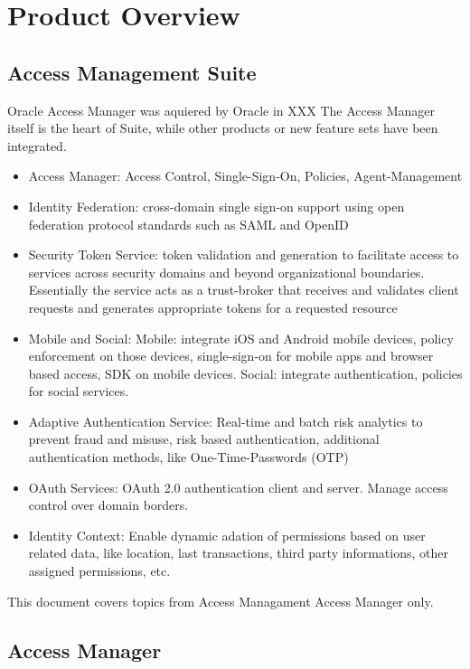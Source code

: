 
\chapter[Product Overview]{Product Overview}

\section{Access Management Suite}

Oracle Access Manager was aquiered by Oracle in
XXX
The Access Manager itself is the heart of Suite, while other products or new feature sets have been integrated. 


\begin{itemize}
    \item Access Manager: Access Control, Single-Sign-On, Policies, Agent-Management
    \item Identity Federation: cross-domain single sign-on support using open federation protocol standards such as SAML and OpenID
    \item Security Token Service: token validation and generation to facilitate access to services across security domains and beyond organizational boundaries. Essentially the service acts as a trust-broker that receives and validates client requests and generates appropriate tokens for a requested resource
    \item Mobile and Social: Mobile: integrate iOS and Android mobile devices, policy enforcement on those devices, single-sign-on for mobile apps and browser based access, SDK on mobile devices. Social: integrate authentication, policies for social services.
    \item Adaptive Authentication Service: Real-time and batch risk analytics to prevent fraud and misuse, risk based authentication, additional authentication methods, like One-Time-Passwords (OTP)
    \item OAuth Services: OAuth 2.0 authentication client and server. Manage access control over domain borders.
    \item Identity Context: Enable dynamic adation of permissions based on user related data, like location, last transactions, third party informations, other assigned permissions, etc.
\end{itemize}


This document covers topics from Access Managament Access Manager only.


\section{Access Manager}


